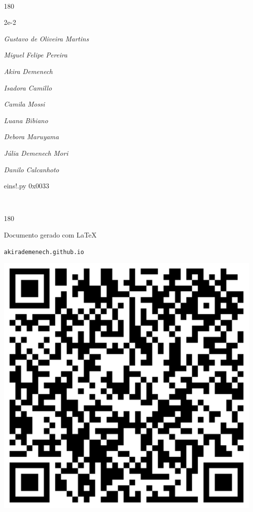 \documentclass[12pt]{article}
\begin{document}
	\ 
	\vfill
	\begin{turn}{180}	
		\begin{minipage}{\textwidth}
		  	\ttfamily %
			\centering
			{\Huge 2e-2}
		  
			\hfill
		  
			

\textit{\small Gustavo de Oliveira Martins}

\textit{\small Miguel Felipe Pereira}

\textit{\small Akira Demenech}

\textit{\small Isadora Camillo}

\textit{\small Camila Mossi}

\textit{\small Luana Bibiano}

\textit{\small Debora Maruyama}

\textit{\small Júlia Demenech Mori}

\textit{\small Danilo Calcanhoto}

\bigskip

eins!.py
0x0033


		\end{minipage}	
	\end{turn}
	\vfill
	\

\pagebreak

	\begin{turn}{180}	
		\begin{minipage}{\textwidth}		  
		  Documento gerado com \LaTeX			
		  
		  \texttt{akirademenech.github.io}

		  \includegraphics[height=0.3\textheight]{2e-2.pdf}

		\end{minipage}	
	\end{turn}  
		  
\end{document}
